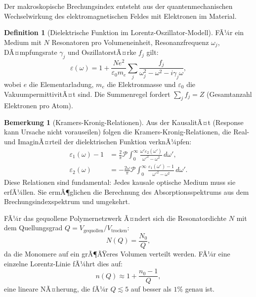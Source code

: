 ﻿\documentclass[a4paper,12pt]{article}
\theoremstyle{definition}
\newtheorem{definition}{Definition}[section]
\newtheorem{bemerkung}{Bemerkung}[section]
\begin{document}
	Der makroskopische Brechungsindex entsteht aus der quantenmechanischen
	Wechselwirkung des elektromagnetischen Feldes mit Elektronen im Material.
	
	\begin{definition}[Dielektrische Funktion im Lorentz-Oszillator-Modell]
		\label{def:lorentz}
		FÃ¼r ein Medium mit $N$ Resonatoren pro Volumeneinheit, Resonanzfrequenz
		$\omega_j$, DÃ¤mpfungsrate $\gamma_j$ und OszillatorstÃ¤rke $f_j$ gilt:
		\begin{equation}
			\varepsilon(\omega) = 1 + \frac{N e^2}{\varepsilon_0 m_e}
			\sum_j \frac{f_j}{\omega_j^2 - \omega^2 - i\gamma_j \omega},
			\label{eq:lorentz}
		\end{equation}
		wobei $e$ die Elementarladung, $m_e$ die Elektronmasse und
		$\varepsilon_0$ die VakuumpermittivitÃ¤t sind.
		Die Summenregel fordert $\sum_j f_j = Z$ (Gesamtanzahl Elektronen pro Atom).
	\end{definition}
	
	\begin{bemerkung}[Kramers-Kronig-Relationen]
		Aus der KausalitÃ¤t (Response kann Ursache nicht vorauseilen) folgen die
		Kramers-Kronig-Relationen, die Real- und ImaginÃ¤rteil der dielektrischen
		Funktion verknÃ¼pfen:
		\begin{align}
			\varepsilon_1(\omega) - 1 &= \frac{2}{\pi} \mathcal{P}
			\int_0^\infty \frac{\omega' \varepsilon_2(\omega')}{\omega'^2 - \omega^2}\, d\omega',\\
			\varepsilon_2(\omega) &= -\frac{2\omega}{\pi} \mathcal{P}
			\int_0^\infty \frac{\varepsilon_1(\omega') - 1}{\omega'^2 - \omega^2}\, d\omega'.
		\end{align}
		Diese Relationen sind fundamental: Jedes kausale optische Medium muss
		sie erfÃ¼llen. Sie ermÃ¶glichen die Berechnung des Absorptionsspektrums
		aus dem Brechungsindexspektrum und umgekehrt.
	\end{bemerkung}
	
	FÃ¼r das gequollene Polymernetzwerk Ã¤ndert sich die Resonatordichte $N$ mit
	dem Quellungsgrad $Q = V_\text{gequollen}/V_\text{trocken}$:
	\begin{equation}
		N(Q) = \frac{N_0}{Q},
		\label{eq:dichte-quellung}
	\end{equation}
	da die Monomere auf ein grÃ¶ÃŸeres Volumen verteilt werden.
	FÃ¼r eine einzelne Lorentz-Linie fÃ¼hrt dies auf:
	\begin{equation}
		n(Q) \approx 1 + \frac{n_0 - 1}{Q},
		\label{eq:n-quellung}
	\end{equation}
	eine lineare NÃ¤herung, die fÃ¼r $Q \lesssim 5$ auf besser als $1\%$ genau ist.
	
\end{document}
